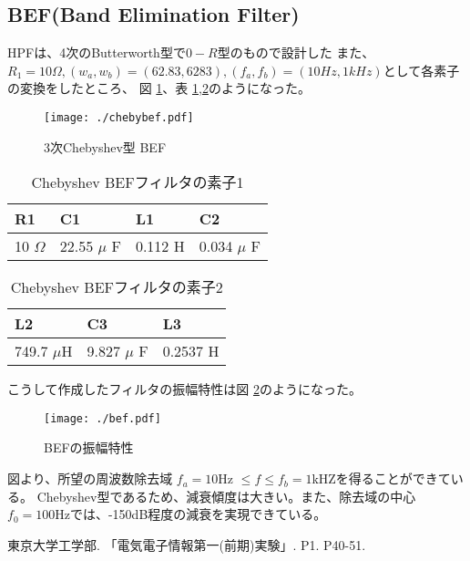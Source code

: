 \documentclass[a4j,twocolumn]{jsarticle}
\begin{document}
\subsection{BEF(Band Elimination Filter)}
HPFは、4次のButterworth型で$0-R型$のもので設計した
また、$R_{1} = 10\Omega,  (w_{a}, w_{b}) = (62.83, 6283) , (f_{a} ,f_{b}) = (10Hz, 1kHz)$として各素子の変換をしたところ、
図 \ref{bef}、表 \ref{befhyou1},\ref{befhyou2}のようになった。
\begin{figure}[H]
    \centering
   \texttt{[image: ./chebybef.pdf]}
   \caption{3次Chebyshev型 BEF}
    \label{bef}
\end{figure}
\begin{table}
    \centering
    \caption{Chebyshev BEFフィルタの素子1}
    \begin{tabular}{@{}llll@{}} \toprule
    R1 & C1 & L1 & C2  \\ \midrule
    10 $\Omega$ & 22.55 $\mu$ F & 0.112 H & 0.034 $\mu$ F \\ \bottomrule
    \end{tabular} 
    \label{befhyou1}
\end{table}
\begin{table}
    \centering
    \caption{Chebyshev BEFフィルタの素子2}
    \begin{tabular}{@{}lll@{}} \toprule
    L2 & C3 & L3   \\ \midrule
    749.7 $\mu$H & 9.827 $\mu$ F & 0.2537 H \\ \bottomrule
    \end{tabular} 
    \label{befhyou2}
\end{table}
こうして作成したフィルタの振幅特性は図 \ref{befs}のようになった。
\begin{figure}[H]
    \centering
   \texttt{[image: ./bef.pdf]}
   \caption{BEFの振幅特性}
    \label{befs}
\end{figure}
図より、所望の周波数除去域 $f_{a} = 10$Hz $\leq f \leq f_{b} = 1$kHZを得ることができている。
Chebyshev型であるため、減衰傾度は大きい。また、除去域の中心 $f_{0} = 100$Hzでは、-150dB程度の減衰を実現できている。




\begin{thebibliography}{}
東京大学工学部. 「電気電子情報第一(前期)実験」. P1. P40-51.
\end{thebibliography}
\end{document}
